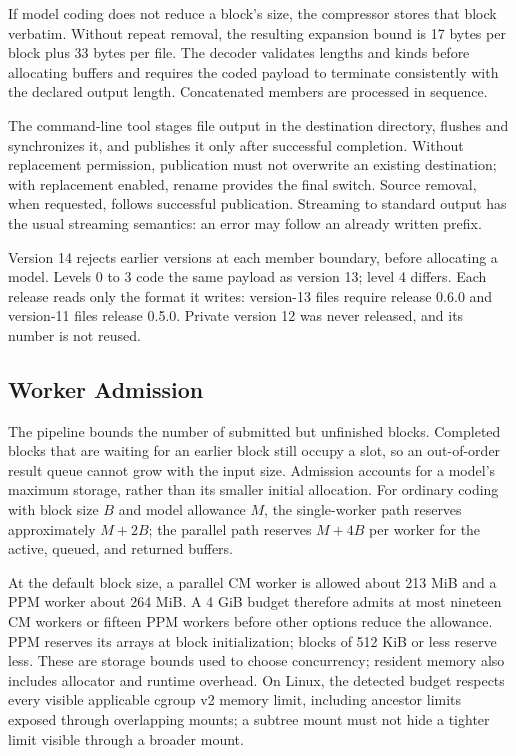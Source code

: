 \documentclass[10pt,letterpaper]{article}
\begin{document}
If model coding does not reduce a block's size, the compressor stores that block verbatim. Without repeat removal, the resulting expansion bound is 17 bytes per block plus 33 bytes per file. The decoder validates lengths and kinds before allocating buffers and requires the coded payload to terminate consistently with the declared output length. Concatenated members are processed in sequence.

The command-line tool stages file output in the destination directory, flushes and synchronizes it, and publishes it only after successful completion. Without replacement permission, publication must not overwrite an existing destination; with replacement enabled, rename provides the final switch. Source removal, when requested, follows successful publication. Streaming to standard output has the usual streaming semantics: an error may follow an already written prefix.

Version 14 rejects earlier versions at each member boundary, before allocating a model. Levels 0 to 3 code the same payload as version 13; level 4 differs. Each release reads only the format it writes: version-13 files require release 0.6.0 and version-11 files release 0.5.0. Private version 12 was never released, and its number is not reused.

\subsection{Worker Admission}
The pipeline bounds the number of submitted but unfinished blocks. Completed blocks that are waiting for an earlier block still occupy a slot, so an out-of-order result queue cannot grow with the input size. Admission accounts for a model's maximum storage, rather than its smaller initial allocation. For ordinary coding with block size $B$ and model allowance $M$, the single-worker path reserves approximately $M+2B$; the parallel path reserves $M+4B$ per worker for the active, queued, and returned buffers.

At the default block size, a parallel CM worker is allowed about 213 MiB and a PPM worker about 264 MiB. A 4 GiB budget therefore admits at most nineteen CM workers or fifteen PPM workers before other options reduce the allowance. PPM reserves its arrays at block initialization; blocks of 512 KiB or less reserve less. These are storage bounds used to choose concurrency; resident memory also includes allocator and runtime overhead. On Linux, the detected budget respects every visible applicable cgroup v2 memory limit, including ancestor limits exposed through overlapping mounts; a subtree mount must not hide a tighter limit visible through a broader mount.
\end{document}
